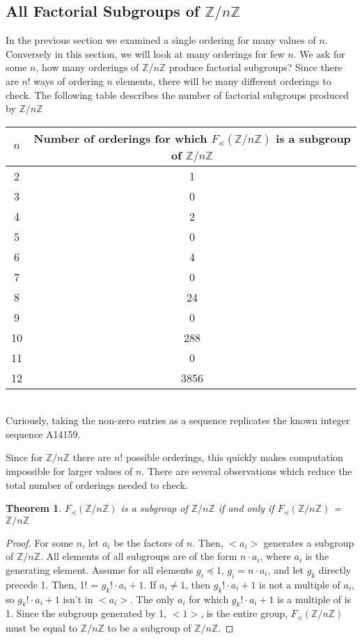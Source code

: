 \documentclass{article}
\newcommand{\ZZ}{\mathbb{Z}}
\newcommand{\ZnZ}{\ZZ/n\ZZ}
\newcommand{\FZ}{F_{\preceq}\left(\ZZ/n\ZZ\right)}
\newtheorem{theorem}{Theorem}
\begin{document}
\subsection{All Factorial Subgroups of $\ZZ/n\ZZ$}
In the previous section we examined a single ordering for many values of $n$. Conversely in this section, we will look at many orderings for few $n$. We ask for some $n$, how many orderings of $\ZZ/n\ZZ$ produce factorial subgroups? Since there are $n!$ ways of ordering $n$ elements, there will be many different orderings to check. The following table describes the number of factorial subgroups produced by $\ZZ/n\ZZ$

\begin{tabular}{|c|c|}
\hline
$n$ & Number of orderings for which $F_\preceq(\ZZ/n\ZZ)$ is a subgroup of $\ZZ/n\ZZ$\\
\hline
2 & 1\\
\hline
3 & 0\\
\hline
4 & 2\\
\hline
5 & 0\\
\hline
6 & 4\\
\hline
7 & 0\\
\hline
8 & 24\\
\hline
9 & 0\\
\hline
10 & 288\\
\hline
11 & 0\\
\hline
12 & 3856\\
\hline
\end{tabular} \vspace{0.1in}
\\Curiously, taking the non-zero entries as a sequence replicates the known integer sequence A14159.
\par Since for $\ZnZ$ there are $n!$ possible orderings, this quickly makes computation impossible for larger values of $n$. There are several observations which reduce the total number of orderings needed to check.
\begin{theorem}
$\FZ$ is a subgroup of $\ZnZ$ if and only if $\FZ$ = $\ZnZ$
\end{theorem}
\begin{proof}
For some $n$, let $a_i$ be the factors of $n$. Then, $<a_i>$ generates a subgroup of $\ZnZ$. All elements of all subgroups are of the form $n\cdot a_i$, where $a_i$ is the generating element. Assume for all elements $g_i\preceq 1$, $g_i = n\cdot a_i$, and let $g_k$ directly precede 1. Then, 1! = $g_k!\cdot a_i + 1$. If $a_i \neq 1$, then $g_k! \cdot a_i + 1$ is not a multiple of $a_i$, so $g_k!\cdot a_i + 1$ isn't in $<a_i>$. The only $a_i$ for which $g_k!\cdot a_i + 1$ is a multiple of is 1. Since the subgroup generated by 1, $<1>$, is the entire group, $\FZ$ must be equal to $\ZnZ$ to be a subgroup of $\ZnZ$. 
\end{proof}
\end{document}
